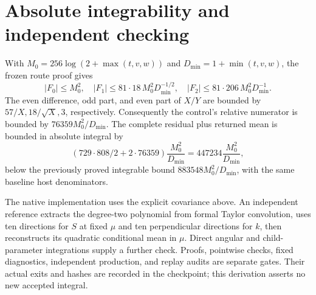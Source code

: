 \documentclass[11pt]{article}
\begin{document}
\section*{Absolute integrability and independent checking}
With \(M_0=256\log(2+\max(t,v,w))\) and
\(D_{\min}=1+\min(t,v,w)\), the frozen route proof gives
\[
 |F_0|\le M_0^2,\quad
 |F_1|\le 81\cdot18\,M_0^2D_{\min}^{-1/2},\quad
 |F_2|\le81\cdot206\,M_0^2D_{\min}^{-1}.
\]
The even difference, odd part, and even part of \(X/Y\) are bounded by
\(57/X,18/\sqrt X,3\), respectively. Consequently the control's relative
numerator is bounded by \(76359M_0^2/D_{\min}\). The complete residual plus
returned mean is bounded in absolute integral by
\[
 (729\cdot808/2+2\cdot76359)\frac{M_0^2}{D_{\min}}
 =447234\frac{M_0^2}{D_{\min}},
\]
below the previously proved integrable bound
\(883548M_0^2/D_{\min}\), with the same baseline host denominators.

The native implementation uses the explicit covariance above. An independent
reference extracts the degree-two polynomial from formal Taylor convolution,
uses ten directions for \(S\) at fixed \(\mu\) and ten perpendicular directions
for \(k\), then reconstructs its quadratic conditional mean in \(\mu\).
Direct angular and child-parameter integrations supply a further check.
Proofs, pointwise checks, fixed diagnostics, independent production, and replay
audits are separate gates. Their actual exits and hashes are recorded in the
checkpoint; this derivation asserts no new accepted integral.
\end{document}
